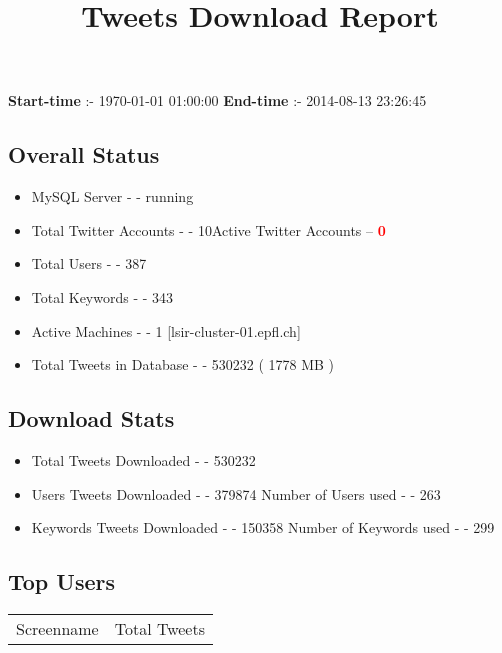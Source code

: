 \documentclass{article}\usepackage[T1]{fontenc}
\begin{document}
\title{\textbf{Tweets Download Report}}
               \date{}
                \maketitle
               \centerline{\textbf{Start-time} :- 1970-01-01 01:00:00 \hspace{40pt} \textbf{End-time} :- 2014-08-13 23:26:45}               \subsection*{Overall Status}                \begin{itemize}                \item MySQL Server - - running               \item Total Twitter Accounts - - 10\newline Active Twitter Accounts -- \textcolor{red}{\textbf{0}}               \item Total Users - - 387               \item Total Keywords - - 343               \item Active Machines - - 1 [lsir-cluster-01.epfl.ch]               \item Total Tweets in Database - - 530232 ( 1778 MB )               \end{itemize}               \subsection*{Download Stats}                \begin{itemize}                \item Total Tweets Downloaded - - 530232               \item Users Tweets Downloaded - - 379874 \newline Number of Users used - - 263               \item Keywords Tweets Downloaded - - 150358 \newline Number of Keywords used - - 299              \end{itemize}              \subsection*{Top Users}\begin{center}         \begin{tabular}{|c|c|}         \hline         Screenname & Total Tweets \\ 

\end{tabular}
\end{center}
\end{document}
